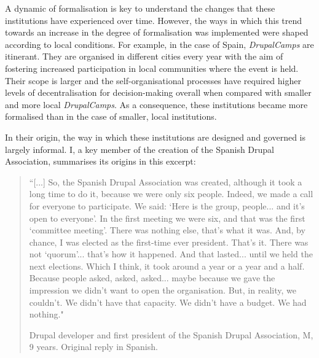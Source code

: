 A dynamic of formalisation is key to understand the changes that these institutions have experienced over time. However, the ways in which this trend towards an increase in the degree of formalisation was implemented were shaped according to local conditions. For example, in the case of Spain, \textit{DrupalCamps} are itinerant. They are organised in different cities every year with the aim of fostering increased participation in local communities where the event is held. Their scope is larger and the self-organisational processes have required higher levels of decentralisation for decision-making overall when compared with smaller and more local \textit{DrupalCamps}. As a consequence, these institutions became more formalised than in the case of smaller, local institutions.

In their origin, the way in which these institutions are designed and governed is largely informal. I, a key member of the creation of the Spanish Drupal Association, summarises its origins in this excerpt:

\begin{quotation}
``[...] So, the Spanish Drupal Association was created, although it took a long time to do it, because we were only six people. Indeed, we made a call for everyone to participate. We said: `Here is the group, people... and it's open to everyone'. In the first meeting we were six, and that was the first `committee meeting'. There was nothing else, that's what it was. And, by chance, I was elected as the first-time ever president. That's it. There was not `quorum'... that's how it happened. And that lasted... until we held the next elections. Which I think, it took around a year or a year and a half. Because people asked, asked, asked... maybe because we gave the impression we didn't want to open the organisation. But, in reality, we couldn't. We didn't have that capacity. We didn't have a budget. We had nothing."

\begin{flushright}\footnotesize{Drupal developer and first president of the Spanish Drupal Association, M, 9 years. Original reply in Spanish.}\end{flushright}
\end{quotation}

